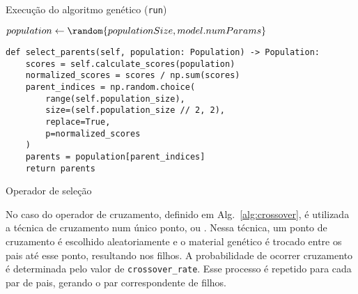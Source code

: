 \begin{algorithm}
    \caption{Execução do algoritmo genético (\texttt{run})}\label{alg:ga_run}
    $population \gets \random{populationSize, model.numParams}$\;
\end{algorithm}

\begin{listing}[!ht]
\begin{verbatim}
def select_parents(self, population: Population) -> Population:
    scores = self.calculate_scores(population)
    normalized_scores = scores / np.sum(scores)
    parent_indices = np.random.choice(
        range(self.population_size),
        size=(self.population_size // 2, 2),
        replace=True,
        p=normalized_scores
    )
    parents = population[parent_indices]
    return parents
\end{verbatim}
\caption{Operador de seleção}
\label{alg:select_parents}
\end{listing}

No caso do operador de cruzamento, definido em Alg.~\ref{alg:crossover}, é utilizada a técnica de cruzamento num único ponto, ou . Nessa técnica, um ponto de cruzamento é escolhido aleatoriamente e o material genético é trocado entre os pais até esse ponto, resultando nos filhos. A probabilidade de ocorrer cruzamento é determinada pelo valor de \texttt{crossover\_rate}. Esse processo é repetido para cada par de pais, gerando o par correspondente de filhos.

